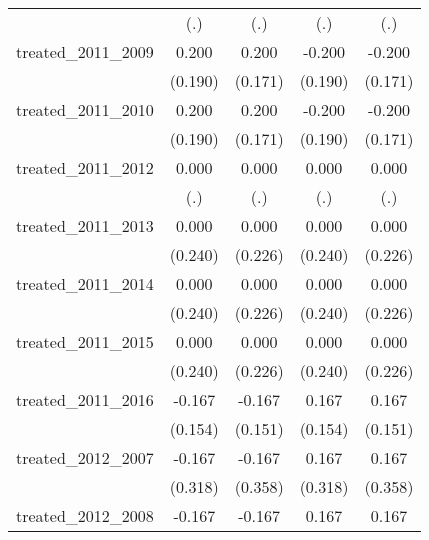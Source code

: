 {\begin{tabular}{l*{4}{c}}
            &         (.)         &         (.)         &         (.)         &         (.)         \\
[1em]
treated\_2011\_2009&       0.200         &       0.200         &      -0.200         &      -0.200         \\
            &     (0.190)         &     (0.171)         &     (0.190)         &     (0.171)         \\
[1em]
treated\_2011\_2010&       0.200         &       0.200         &      -0.200         &      -0.200         \\
            &     (0.190)         &     (0.171)         &     (0.190)         &     (0.171)         \\
[1em]
treated\_2011\_2012&       0.000         &       0.000         &       0.000         &       0.000         \\
            &         (.)         &         (.)         &         (.)         &         (.)         \\
[1em]
treated\_2011\_2013&       0.000         &       0.000         &       0.000         &       0.000         \\
            &     (0.240)         &     (0.226)         &     (0.240)         &     (0.226)         \\
[1em]
treated\_2011\_2014&       0.000         &       0.000         &       0.000         &       0.000         \\
            &     (0.240)         &     (0.226)         &     (0.240)         &     (0.226)         \\
[1em]
treated\_2011\_2015&       0.000         &       0.000         &       0.000         &       0.000         \\
            &     (0.240)         &     (0.226)         &     (0.240)         &     (0.226)         \\
[1em]
treated\_2011\_2016&      -0.167         &      -0.167         &       0.167         &       0.167         \\
            &     (0.154)         &     (0.151)         &     (0.154)         &     (0.151)         \\
[1em]
treated\_2012\_2007&      -0.167         &      -0.167         &       0.167         &       0.167         \\
            &     (0.318)         &     (0.358)         &     (0.318)         &     (0.358)         \\
[1em]
treated\_2012\_2008&      -0.167         &      -0.167         &       0.167         &       0.167         \\

\end{tabular}}
